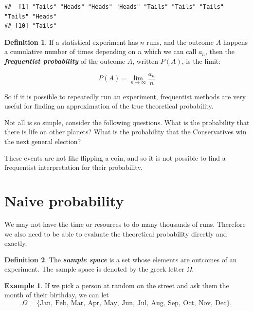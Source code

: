 \documentclass[
]{book}
\theoremstyle{definition}
\newtheorem{definition}{Definition}[chapter]
\theoremstyle{definition}
\newtheorem{example}{Example}[chapter]
\theoremstyle{definition}
\theoremstyle{definition}
\theoremstyle{remark}
\begin{document}
\begin{verbatim}
##  [1] "Tails" "Heads" "Heads" "Heads" "Tails" "Tails" "Tails" "Tails" "Heads"
## [10] "Tails"
\end{verbatim}

\begin{definition}
\protect\hypertarget{def:freq}{}\label{def:freq}If a statistical experiment has \(n\) runs, and the outcome \(A\) happens a cumulative number of times depending on \(n\) which we can call \(a_n\), then the \textbf{\emph{frequentist probability}} of the outcome \(A\), written \(P(A)\), is the limit:

\[P(A) = \lim_{n\to \infty} \frac{a_n}{n}\]
\end{definition}

So if it is possible to repeatedly run an experiment, frequentist methods are very useful for finding an approximation of the true theoretical probability.

Not all is so simple, consider the following questions. What is the probability that there is life on other planets? What is the probability that the Conservatives win the next general election?

These events are not like flipping a coin, and so it is not possible to find a frequentist interpretation for their probability.

\hypertarget{naive-probability}{%
\section{Naive probability}\label{naive-probability}}

We may not have the time or resources to do many thousands of runs. Therefore we also need to be able to evaluate the theoretical probability directly and exactly.

\begin{definition}
\protect\hypertarget{def:samplespace}{}\label{def:samplespace}The \textbf{\emph{sample space}} is a set whose elements are outcomes of an experiment. The sample space is denoted by the greek letter \(\Omega\).
\end{definition}

\begin{example}
\protect\hypertarget{exm:monthspace}{}\label{exm:monthspace}If we pick a person at random on the street and ask them the month of their birthday,
we can let
\[\Omega = \{\text{Jan}, \ \text{Feb}, \ \text{Mar},  \ \text{Apr}, \ \text{May}, \ \text{Jun}, \ \text{Jul}, \ \text{Aug}, \ \text{Sep}, \ \text{Oct}, \ \text{Nov}, \ \text{Dec} \}.\]
\end{example}
\end{document}
